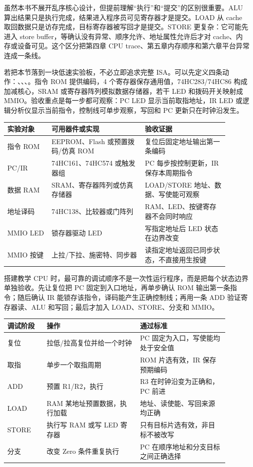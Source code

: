 虽然本书不展开乱序核心设计，但提前理解“执行”和“提交”的区别很重要。ALU 算出结果只是执行完成，结果进入程序员可见寄存器才是提交。LOAD 从 cache 取回数据只是访存完成，目标寄存器被写回才是提交。STORE 更复杂：它可能先进入 store buffer，等确认没有异常、顺序允许、地址属性允许后才对 cache、内存或设备可见。这个区分把第四章 CPU trace、第五章内存顺序和第六章平台异常连成一条线。

若把本节落到一块低速实验板，不必立即追求完整 ISA。可以先定义四条动作：、、、。指令 ROM 提供编码，4 个寄存器保存通用值，74HC283/74HC86 构成加减核心，SRAM 或寄存器阵列模拟数据存储器，若干 LED 和拨码开关映射成 MMIO。验收重点是每一步都可观察：PC LED 显示当前取指地址，IR LED 或逻辑分析仪显示当前指令，控制线可单步观察，写回和 PC 更新只在时钟沿发生。

\begin{longtable}{L{0.18\linewidth}L{0.38\linewidth}L{0.34\linewidth}}
\toprule
实验对象 & 可用器件或实现 & 验收证据 \\
\midrule
指令 ROM & EEPROM、Flash 或预置拨码/仿真 ROM & 复位后固定地址输出第一条编码 \\
PC/IR & 74HC161、74HC574 或触发器组 & PC 每步按控制更新，IR 保存本周期指令 \\
数据 RAM & SRAM、寄存器阵列或仿真存储器 & LOAD/STORE 地址、数据、写使能可观察 \\
地址译码 & 74HC138、比较器或门阵列 & RAM、LED、按键寄存器不会同时响应 \\
MMIO LED & 锁存器驱动 LED & 写指定地址后 LED 状态在边界改变 \\
MMIO 按键 & 上拉/下拉、施密特、同步器 & 读指定地址返回已同步状态，不直接用生按键 \\
\bottomrule
\end{longtable}

搭建教学 CPU 时，最可靠的调试顺序不是一次性运行程序，而是把每个状态边界单独验收。先让复位把 PC 固定到入口地址，再单步确认 ROM 输出第一条指令；随后确认 IR 能锁存该指令，译码能产生正确控制线；再用一条 ADD 验证寄存器读、ALU 和写回；最后才加入 LOAD、STORE、分支和 MMIO。

\begin{longtable}{L{0.16\linewidth}L{0.38\linewidth}L{0.36\linewidth}}
\toprule
调试阶段 & 操作 & 通过标准 \\
\midrule
复位 & 拉低/拉高复位并给一个时钟 & PC 固定为入口，写使能均处于安全值 \\
取指 & 单步一个取指周期 & ROM 片选有效，IR 保存预期编码 \\
ADD & 预置 R1/R2，执行  & R3 在时钟沿变为正确和，PC 前进 \\
LOAD & RAM 某地址预置数据，执行加载 & 地址、读使能、写回来源均正确 \\
STORE & 执行写 RAM 或写 LED 寄存器 & 只有目标片选有效，非目标不被改写 \\
分支 & 改变 Zero 条件重复执行 & PC 在顺序地址和分支目标之间正确选择 \\
\bottomrule
\end{longtable}

